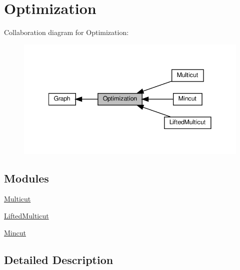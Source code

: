 \hypertarget{group__group__opt}{}\section{Optimization}
\label{group__group__opt}
Collaboration diagram for Optimization\+:
\nopagebreak
\begin{figure}[H]
\begin{center}
\leavevmode
\includegraphics[width=341pt]{group__group__opt}
\end{center}
\end{figure}
\subsection*{Modules}
\begin{DoxyCompactItemize}
\item 
\hyperlink{group__group__multicut}{Multicut}
\item 
\hyperlink{group__group__lifted__multicut}{Lifted\+Multicut}
\item 
\hyperlink{group__group__mincut}{Mincut}
\end{DoxyCompactItemize}


\subsection{Detailed Description}
